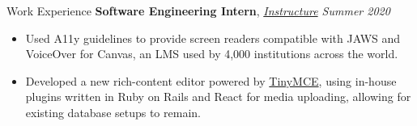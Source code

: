 \documentclass{resume}
\begin{document}
\begin{rSection}{Work Experience}
    {\bf Software Engineering Intern}, {\em \href{https://www.instructure.com/}{Instructure} \hfill Summer 2020}
    \vspace{-6pt}
    \begin{itemize}[nosep]
        \item Used A11y guidelines to provide screen readers compatible with JAWS and VoiceOver for Canvas, an LMS used by 4,000 institutions across the world.
        \item Developed a new rich-content editor powered by \href{https://www.tiny.cloud/}{TinyMCE}, using in-house plugins written in Ruby on Rails and React for media uploading, allowing for existing database setups to remain.
    \end{itemize}
    
    
\end{rSection}
\end{document}
